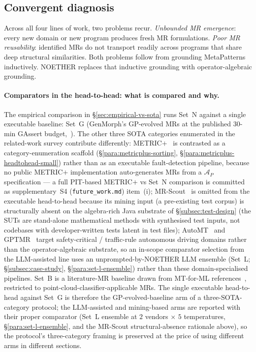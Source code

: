 \documentclass[acmsmall, screen]{acmart}
\begin{document}
\subsection{Convergent diagnosis}

Across all four lines of work, two problems recur. \emph{Unbounded MR emergence}: every new domain or new program produces fresh MR formulations. \emph{Poor MR reusability}: identified MRs do not transport readily across programs that share deep structural similarities. Both problems follow from grounding MetaPatterns inductively. NOETHER replaces that inductive grounding with operator-algebraic grounding.

\paragraph{Comparators in the head-to-head: what is compared and why.}
\label{para:comparators-and-why}
The empirical comparison in \S\ref{sec:empirical-vs-sota} runs Set~N
against a single executable baseline: Set~G (GenMorph's GP-evolved
MRs at the published 30-min GAssert budget,~\cite{GenMorph2024}). The
other three SOTA categories enumerated in the related-work survey
contribute differently: METRIC$+$~\cite{SunMETRICplus2021} is contrasted
as a category-enumeration scaffold (\S\ref{para:metricplus-sorting},
\S\ref{para:metricplus-headtohead-small}) rather than as an executable
fault-detection pipeline, because no public METRIC$+$ implementation
auto-generates MRs from a $\mathcal{A}_{P}$ specification --- a full
PIT-based METRIC$+$ vs Set~N comparison is committed as supplementary~S4 (\texttt{future\_work.md})
item~(i); MR-Scout~\cite{MRScout2024} is omitted from the executable
head-to-head because its mining input (a pre-existing test corpus) is
structurally absent on the algebra-rich Java substrate of
\S\ref{subsec:test-design} (the SUTs are stand-alone mathematical
methods with synthesised test inputs, not codebases with developer-written
tests latent in test files); AutoMT~\cite{AutoMT2025} and
GPTMR~\cite{GPTMR2025} target safety-critical / traffic-rule autonomous
driving domains rather than the operator-algebraic substrate, so an
in-scope comparator selection from the LLM-assisted line uses an
unprompted-by-NOETHER LLM ensemble (Set~L; \S\ref{subsec:case-study},
\S\ref{para:set-l-ensemble}) rather than these domain-specialised
pipelines. Set~B is a literature-MR baseline drawn from MT-for-ML
references~\cite{Segura2016, Shin2024, AutoMT2025}, restricted to
point-cloud-classifier-applicable MRs. The single executable
head-to-head against Set~G is therefore the GP-evolved-baseline arm
of a three-SOTA-category protocol; the LLM-assisted and mining-based
arms are reported with their proper comparator (Set~L ensemble at
$2$ vendors $\times$ $5$ temperatures, \S\ref{para:set-l-ensemble}, and
the MR-Scout structural-absence rationale above), so the protocol's
three-category framing is preserved at the price of using different
arms in different sections.
\end{document}
